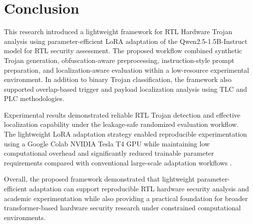 \documentclass[conference]{IEEEtran}
\begin{document}

\section{Conclusion}
\label{sec:conclusion}

This research introduced a lightweight framework for RTL Hardware Trojan analysis using parameter-efficient LoRA adaptation of the Qwen2.5-1.5B-Instruct model for RTL security assessment. The proposed workflow combined synthetic Trojan generation, obfuscation-aware preprocessing, instruction-style prompt preparation, and localization-aware evaluation within a low-resource experimental environment. In addition to binary Trojan classification, the framework also supported overlap-based trigger and payload localization analysis using TLC and PLC methodologies.

Experimental results demonstrated reliable RTL Trojan detection and effective localization capability under the leakage-safe randomized evaluation workflow. The lightweight LoRA adaptation strategy enabled reproducible experimentation using a Google Colab NVIDIA Tesla T4 GPU while maintaining low computational overhead and significantly reduced trainable parameter requirements compared with conventional large-scale adaptation workflows \cite{lora,qlora,kundu2025pearl}.

Overall, the proposed framework demonstrated that lightweight parameter-efficient adaptation can support reproducible RTL hardware security analysis and academic experimentation while also providing a practical foundation for broader transformer-based hardware security research under constrained computational environments.





\end{document}
